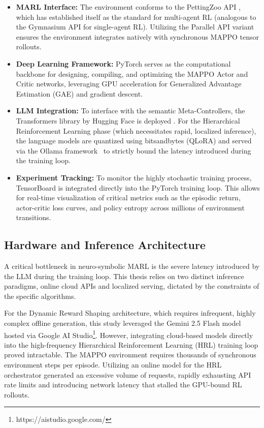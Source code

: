 \begin{itemize}
    \item \textbf{MARL Interface:} The environment conforms to the PettingZoo API \parencite{Terry_Black_Grammel_Jayakumar_Hari_Sullivan_Santos_Perez_Horsch_Dieffendahl_et_al._2021}, which has established itself as the standard for multi-agent RL (analogous to the Gymnasium API for single-agent RL). Utilizing the Parallel API variant ensures the environment integrates natively with synchronous MAPPO tensor rollouts.
    \item \textbf{Deep Learning Framework:} PyTorch \parencite{Paszke_Gross_Massa_Lerer_Bradbury_Chanan_Killeen_Lin_Gimelshein_Antiga_et_al_2019} serves as the computational backbone for designing, compiling, and optimizing the MAPPO Actor and Critic networks, leveraging GPU acceleration for Generalized Advantage Estimation (GAE) and gradient descent.
    \item \textbf{LLM Integration:} To interface with the semantic Meta-Controllers, the Transformers library by Hugging Face is deployed \parencite{Wolf_Debut_Sanh_Chaumond_Delangue_Moi_Cistac_Rault_Louf_Funtowicz_et_al._2020}. For the Hierarchical Reinforcement Learning phase (which necessitates rapid, localized inference), the language models are quantized using bitsandbytes (QLoRA) \parencite{Dettmers_Pagnoni_Holtzman_Zettlemoyer_2023} and served via the Ollama framework~\parencite{ollama_2024} to strictly bound the latency introduced during the training loop.
    \item \textbf{Experiment Tracking:} To monitor the highly stochastic training process, TensorBoard is integrated directly into the PyTorch training loop. This allows for real-time visualization of critical metrics such as the episodic return, actor-critic loss curves, and policy entropy across millions of environment transitions.
\end{itemize}

\subsection{Hardware and Inference Architecture}
\label{sec:env_hardware}

A critical bottleneck in neuro-symbolic MARL is the severe latency introduced by the LLM during the training loop. This thesis relies on two distinct inference paradigms, online cloud APIs and localized serving, dictated by the constraints of the specific algorithms.

For the Dynamic Reward Shaping architecture, which requires infrequent, highly complex offline generation, this study leveraged the Gemini 2.5 Flash model hosted via Google AI Studio\footnote{https://aistudio.google.com/}. However, integrating cloud-based models directly into the high-frequency Hierarchical Reinforcement Learning (HRL) training loop proved intractable. The MAPPO environment requires thousands of synchronous environment steps per episode. Utilizing an online model for the HRL orchestrator generated an excessive volume of requests, rapidly exhausting API rate limits and introducing network latency that stalled the GPU-bound RL rollouts.

